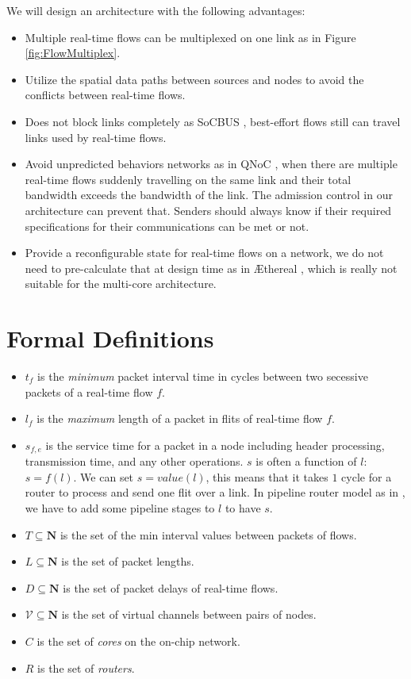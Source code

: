 \documentclass[10pt]{article}
\begin{document}
We will design an architecture with the following advantages:
\begin{itemize}
\item Multiple real-time flows can be multiplexed on one link
\cite{Ferrari90ascheme} as in Figure \ref{fig:FlowMultiplex}.
\item Utilize the spatial data paths between sources and nodes to avoid the 
conflicts between real-time flows.
\item Does not block links completely as SoCBUS \cite{SoCBUS}, best-effort flows 
still can travel links used by real-time flows.
\item Avoid unpredicted behaviors networks as in QNoC \cite{QNoC}, when there are 
multiple real-time flows suddenly travelling on the same link and their total bandwidth 
exceeds the bandwidth of the link. The admission control in our architecture can 
prevent that. Senders should always know if their required specifications for 
their communications can be met or not. 
\item Provide a reconfigurable state for real-time flows on a network, we do not 
need to pre-calculate that at design time as in \AE thereal \cite{Goossens_chapter4}, 
which is really not suitable for the multi-core architecture.
\end{itemize}
\section{Formal Definitions}
\begin{itemize}
\item $t_f$ is the {\em minimum} packet interval time in cycles between two
secessive packets of a real-time flow $f$.
\item $l_f$ is the {\em maximum} length of a packet in flits of real-time flow
$f$.
\item $s_{f,e}$ is the service time for a packet in a node including header 
processing, transmission time, and any other operations. $s$ is often a 
function of $l$: $s=f(l)$. We can set $s=value(l)$, this means that it takes $1$
cycle for a router to process and send one flit over a link. In pipeline router
model as in \cite{PehDelayModel, PehSpecPipeR}, we have to add some pipeline stages to $l$ to have $s$. 
\item $T \subseteq \mathbf{N}$ is the set of the min interval values between packets of flows. 
\item $L \subseteq \mathbf{N}$ is the set of packet lengths.
\item $D \subseteq \mathbf{N}$ is the set of packet delays of real-time flows.
\item $\mathcal{V} \subseteq \mathbf{N}$ is the set of virtual channels between pairs of nodes.
\item $C$ is the set of {\em cores} on the on-chip network.
\item $R$ is the set of {\em routers}.
\end{itemize}
\end{document}
